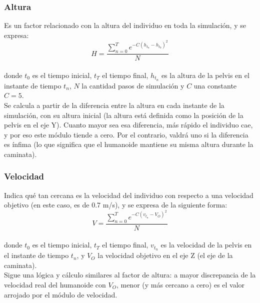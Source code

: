 \documentclass{article}
\begin{document}
\subsubsection{Altura}
\label{altura}
Es un factor relacionado con la altura del individuo en toda la simulaci\'on, y se expresa:\\
\begin{equation}
  H = \frac{\sum_{n=0}^{T} {e^{-C( h_{t_{n}} - h_{t_{0}} )^2  }}}{N}
\end{equation}
\\ donde $t_{0}$ es el tiempo inicial, $t_{T}$ el tiempo final, $h_{t_{n}}$ es la altura de la pelvis en el instante de tiempo $t_{n}$, $N$ la cantidad pasos de simulaci\'on y $C$ una constante $C=5$.
\\
Se calcula a partir de la diferencia entre la altura en cada instante de la simulaci\'on, con su altura inicial (la altura est\'a definida como la posici\'on de la pelvis en el eje Y). Cuanto mayor sea esa diferencia, m\'as r\'apido el individuo cae, y por eso este m\'odulo tiende a cero. Por el contrario, valdr\'a uno si la diferencia es \'infima (lo que significa que el humanoide mantiene su misma altura durante la caminata).


\subsubsection{Velocidad}
\label{velocidad}
Indica qu\'e tan cercana es la velocidad del individuo con respecto a una velocidad objetivo (en este caso, es de 0.7 m/s), y se expresa de la siguiente forma:\\
\begin{equation}
  V = \frac{\sum_{n=0}^{T} {e^{-C( v_{t_{n}} - V_{O} )^2  }}}{N}
\end{equation}
\\ donde $t_{0}$ es el tiempo inicial, $t_{T}$ el tiempo final, $v_{t_{n}}$ es la velocidad de la pelvis en el instante de tiempo $t_{n}$, y $V_{O}$ la velocidad objetivo en el eje Z (el eje de la caminata).
\\
Sigue una l\'ogica y c\'alculo similares al factor de altura: a mayor discrepancia de la velocidad real del humanoide con $V_{O}$, menor (y m\'as cercano a cero) es el valor arrojado por el m\'odulo de velocidad. 
\end{document}
